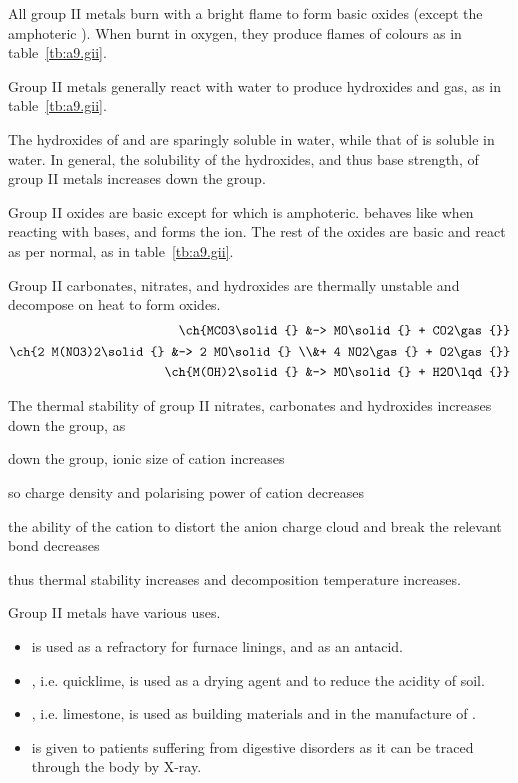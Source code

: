 \documentclass[Chemistry.tex]{subfiles}
\begin{document}
All group II metals burn with a bright flame to form basic oxides (except the amphoteric ). When burnt in oxygen, they produce flames of colours as in table~\ref{tb:a9.gii}.

Group II metals generally react with water to produce hydroxides and  gas, as in table~\ref{tb:a9.gii}.

The hydroxides of  and  are sparingly soluble in water, while that of  is soluble in water. In general, the solubility of the hydroxides, and thus base strength, of group II metals increases down the group.

Group II oxides are basic except for  which is amphoteric.  behaves like  when reacting with bases, and forms the  ion. The rest of the oxides are basic and react as per normal, as in table~\ref{tb:a9.gii}.

Group II carbonates, nitrates, and hydroxides are thermally unstable and decompose on heat to form oxides. \begin{align}\ch{MCO3\solid{} &-> MO\solid{} + CO2\gas{}}\\\begin{split}\ch{2 M(NO3)2\solid{} &-> 2 MO\solid{} \\&+ 4 NO2\gas{} + O2\gas{}}\end{split}\\\ch{M(OH)2\solid{} &-> MO\solid{} + H2O\lqd{}}\end{align}

The thermal stability of group II nitrates, carbonates and hydroxides increases down the group, as \begin{slinenum}
\item down the group, ionic size of cation increases
\item so charge density and polarising power of cation decreases
\item the ability of the cation to distort the anion charge cloud and break the relevant bond decreases
\item thus thermal stability increases and decomposition temperature increases.\end{slinenum}

Group II metals have various uses. \begin{itemize}
\item {} is used as a refractory for furnace linings, and as an antacid.
\item {}, i.e. quicklime, is used as a drying agent and to reduce the acidity of soil.
\item {}, i.e. limestone, is used as building materials and in the manufacture of .
\item {} is given to patients suffering from digestive disorders as it can be traced through the body by X-ray.
\end{itemize}
\end{document}
